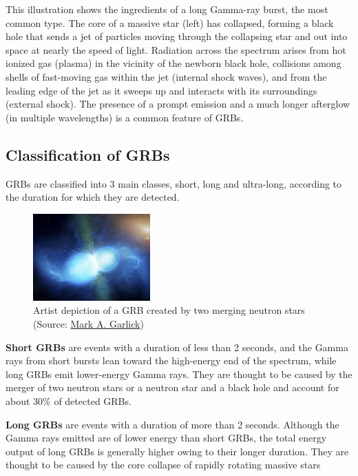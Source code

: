 \documentclass[11pt]{book} %
\begin{document}
This illustration shows the ingredients of a long Gamma-ray burst, the most common type. The core of a massive star (left) has collapsed, forming a black hole that sends a jet of particles moving through the collapsing star and out into space at nearly the speed of light. Radiation across the spectrum arises from hot ionized gas (plasma) in the vicinity of the newborn black hole, collisions among shells of fast-moving gas within the jet (internal shock waves), and from the leading edge of the jet as it sweeps up and interacts with its surroundings (external shock). The presence of a prompt emission and a much longer afterglow (in multiple wavelengths) is a common feature of GRBs.

\subsection{Classification of GRBs}
GRBs are classified into 3 main classes, short, long and ultra-long, according to the duration for which they are detected.

\begin{figure}
    \includegraphics[width=0.4\textwidth]{Pictures/neutronstars.jpg}
    \caption{Artist depiction of a GRB created by two merging neutron stars (Source: \href{http://www.markgarlick.com/index.html}{Mark A. Garlick})}
\end{figure}

\textbf{Short GRBs} are events with a duration of less than 2 seconds, and the Gamma rays from short bursts lean toward the high-energy end of the spectrum, while long GRBs emit lower-energy Gamma rays. They are thought to be caused by the merger of two neutron stars or a neutron star and a black hole and account for about 30\% of detected GRBs.


\textbf{Long GRBs} are events with a duration of more than 2 seconds. Although the Gamma rays emitted are of lower energy than short GRBs, the total energy output of long GRBs is generally higher owing to their longer duration. They are thought to be caused by the core collapse of rapidly rotating massive stars 
\end{document}
